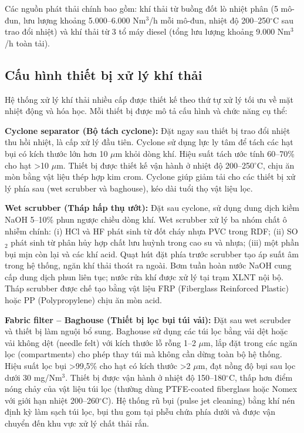 \documentclass[../main.tex]{subfiles}
\begin{document}
Các nguồn phát thải chính bao gồm: khí thải từ buồng đốt lò nhiệt phân (5 mô-đun, lưu lượng khoảng 5.000--6.000 Nm$^3$/h mỗi mô-đun, nhiệt độ 200--250$^\circ\mathrm{C}$ sau trao đổi nhiệt) và khí thải từ 3 tổ máy diesel (tổng lưu lượng khoảng 9.000 Nm$^3$/h toàn tải).

\subsection{Cấu hình thiết bị xử lý khí thải}

Hệ thống xử lý khí thải nhiều cấp được thiết kế theo thứ tự xử lý tối ưu về mặt nhiệt động và hóa học. Mỗi thiết bị được mô tả cấu hình và chức năng cụ thể:

\textbf{Cyclone separator (Bộ tách cyclone):} Đặt ngay sau thiết bị trao đổi nhiệt thu hồi nhiệt, là cấp xử lý đầu tiên. Cyclone sử dụng lực ly tâm để tách các hạt bụi có kích thước lớn hơn 10 $\mu$m khỏi dòng khí. Hiệu suất tách ước tính 60--70\% cho hạt >10 $\mu$m. Thiết bị được thiết kế vận hành ở nhiệt độ 200--250$^\circ\mathrm{C}$, chịu ăn mòn bằng vật liệu thép hợp kim crom. Cyclone giúp giảm tải cho các thiết bị xử lý phía sau (wet scrubber và baghouse), kéo dài tuổi thọ vật liệu lọc.

\textbf{Wet scrubber (Tháp hấp thụ ướt):} Đặt sau cyclone, sử dụng dung dịch kiềm NaOH 5--10\% phun ngược chiều dòng khí. Wet scrubber xử lý ba nhóm chất ô nhiễm chính: (i) HCl và HF phát sinh từ đốt cháy nhựa PVC trong RDF; (ii) SO$_2$ phát sinh từ phân hủy hợp chất lưu huỳnh trong cao su và nhựa; (iii) một phần bụi mịn còn lại và các khí acid. Quạt hút đặt phía trước scrubber tạo áp suất âm trong hệ thống, ngăn khí thải thoát ra ngoài. Bơm tuần hoàn nước NaOH cung cấp dung dịch phun liên tục; nước rửa khí được xử lý tại trạm XLNT nội bộ. Tháp scrubber được chế tạo bằng vật liệu FRP (Fiberglass Reinforced Plastic) hoặc PP (Polypropylene) chịu ăn mòn acid.

\textbf{Fabric filter -- Baghouse (Thiết bị lọc bụi túi vải):} Đặt sau wet scrubder và thiết bị làm nguội bổ sung. Baghouse sử dụng các túi lọc bằng vải dệt hoặc vải không dệt (needle felt) với kích thước lỗ rỗng 1--2 $\mu$m, lắp đặt trong các ngăn lọc (compartments) cho phép thay túi mà không cần dừng toàn bộ hệ thống. Hiệu suất lọc bụi >99,5\% cho hạt có kích thước >2 $\mu$m, đạt nồng độ bụi sau lọc dưới 30 mg/Nm$^3$. Thiết bị được vận hành ở nhiệt độ 150--180$^\circ\mathrm{C}$, thấp hơn điểm nóng chảy của vật liệu túi lọc (thường dùng PTFE-coated fiberglass hoặc Nomex với giới hạn nhiệt 200--260$^\circ\mathrm{C}$). Hệ thống rũ bụi (pulse jet cleaning) bằng khí nén định kỳ làm sạch túi lọc, bụi thu gom tại phễu chứa phía dưới và được vận chuyển đến khu vực xử lý chất thải rắn.
\end{document}
